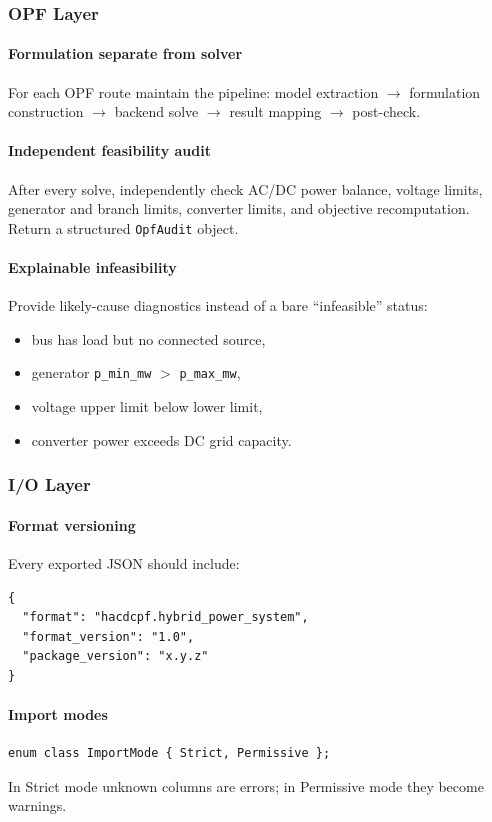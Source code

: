 \subsubsection{OPF Layer}

\paragraph{Formulation separate from solver}
For each OPF route maintain the pipeline:
model extraction $\to$ formulation construction $\to$ backend solve
$\to$ result mapping $\to$ post-check.

\paragraph{Independent feasibility audit}
After every solve, independently check AC/DC power balance, voltage limits,
generator and branch limits, converter limits, and objective recomputation.
Return a structured \texttt{OpfAudit} object.

\paragraph{Explainable infeasibility}
Provide likely-cause diagnostics instead of a bare ``infeasible'' status:
\begin{itemize}
  \item bus has load but no connected source,
  \item generator \texttt{p\_min\_mw} $>$ \texttt{p\_max\_mw},
  \item voltage upper limit below lower limit,
  \item converter power exceeds DC grid capacity.
\end{itemize}

\subsubsection{I/O Layer}
\label{sec:io-recommendations}

\paragraph{Format versioning}
Every exported JSON should include:
\begin{verbatim}
{
  "format": "hacdcpf.hybrid_power_system",
  "format_version": "1.0",
  "package_version": "x.y.z"
}
\end{verbatim}

\paragraph{Import modes}
\begin{verbatim}
enum class ImportMode { Strict, Permissive };
\end{verbatim}
In Strict mode unknown columns are errors; in Permissive mode they become
warnings.

